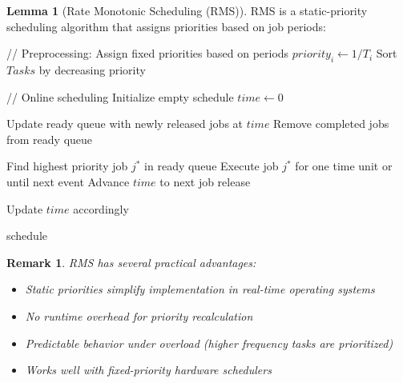 \documentclass{article}
\newtheorem{remark}{Remark}
\theoremstyle{definition}
\newtheorem{lemma}{Lemma}
\begin{document}
\begin{lemma}[Rate Monotonic Scheduling (RMS)]
RMS is a static-priority scheduling algorithm that assigns priorities based on job periods:

\begin{algorithm}
\caption{Rate Monotonic Scheduling (RMS)}
\begin{algorithmic}[1]
    \State // Preprocessing: Assign fixed priorities based on periods
        \State $priority_i \gets 1/T_i$ 
    \EndFor
    \State Sort $Tasks$ by decreasing priority
    
    \State // Online scheduling
    \State Initialize empty schedule
    \State $time \gets 0$
    
        \State Update ready queue with newly released jobs at $time$
        \State Remove completed jobs from ready queue
        
            \State Find highest priority job $j^*$ in ready queue
            \State Execute job $j^*$ for one time unit or until next event
        \Else
            \State Advance $time$ to next job release
        \EndIf
        
        \State Update $time$ accordingly
    \EndWhile
    
    \State \Return schedule
\EndProcedure
\end{algorithmic}
\end{algorithm}

\begin{remark}
RMS has several practical advantages:
\begin{itemize}
    \item Static priorities simplify implementation in real-time operating systems
    \item No runtime overhead for priority recalculation
    \item Predictable behavior under overload (higher frequency tasks are prioritized)
    \item Works well with fixed-priority hardware schedulers
\end{itemize}
\end{remark}
\end{lemma}
\end{document}
